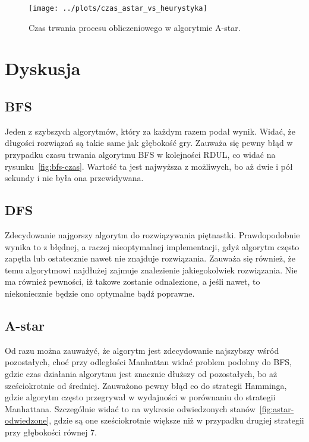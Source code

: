 \documentclass{classrep}
\begin{document}
    \begin{figure}[!h]
        \centering
        \texttt{[image: ../plots/czas\_astar\_vs\_heurystyka]}
        \caption{Czas trwania procesu obliczeniowego w algorytmie A-star.}
        \label{fig:astar-czas}
    \end{figure}

    \clearpage


    \section{Dyskusja}\label{sec:dyskusja}

    \subsection{BFS}\label{subsec:bfs}
    Jeden z szybszych algorytmów, który za każdym razem podał wynik.
    Widać, że długości rozwiązań są takie same jak głębokość gry.
    Zauważa się pewny błąd w przypadku czasu trwania algorytmu BFS w kolejności RDUL, co widać na rysunku~\ref{fig:bfs-czas}.
    Wartość ta jest najwyższa z możliwych, bo aż dwie i pół sekundy i nie była ona przewidywana.

    \subsection{DFS}\label{subsec:dfs}
    Zdecydowanie najgorszy algorytm do rozwiązywania piętnastki.
    Prawdopodobnie wynika to z błędnej, a raczej nieoptymalnej implementacji, gdyż algorytm często zapętla lub ostatecznie
    nawet nie znajduje rozwiązania.
    Zauważa się również, że temu algorytmowi najdłużej zajmuje znalezienie jakiegokolwiek rozwiązania.
    Nie ma również pewności, iż takowe zostanie odnalezione, a jeśli nawet, to niekoniecznie będzie ono optymalne bądź poprawne.

    \subsection{A-star}\label{subsec:a-star}
    Od razu można zauważyć, że algorytm jest zdecydowanie najszybszy wśród pozostałych, choć przy odległości Manhattan widać
    problem podobny do BFS, gdzie czas działania algorytmu jest znacznie dłuższy od pozostałych, bo aż sześciokrotnie od średniej.
    Zauważono pewny błąd co do strategii Hamminga, gdzie algorytm często przegrywał w wydajności w porównaniu do strategii Manhattana.
    Szczególnie widać to na wykresie odwiedzonych stanów~\ref{fig:astar-odwiedzone}, gdzie są one sześciokrotnie większe
    niż w przypadku drugiej strategii przy głębokości równej 7.
\end{document}
